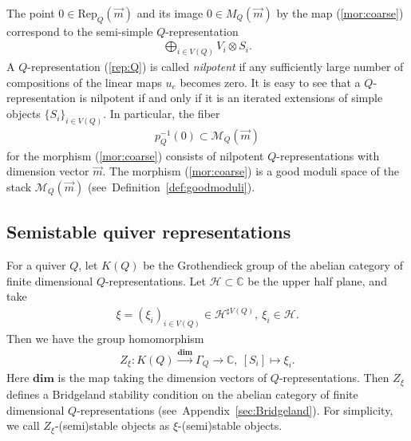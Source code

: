 \documentclass[11pt]{amsart}
\theoremstyle{plain}
\theoremstyle{definition}
\theoremstyle{remark}
\newcommand{\hH}{\mathcal{H}}
\newcommand{\mM}{\mathcal{M}}
\begin{document}
The point $0 \in \mathrm{Rep}_Q(\vec{m})$ and its 
image $0 \in M_Q(\vec{m})$ by the map (\ref{mor:coarse})
correspond to the semi-simple $Q$-representation 
\begin{align*}
\bigoplus_{i\in V(Q)}V_i \otimes S_i.
\end{align*}
A $Q$-representation (\ref{rep:Q})
is called \textit{nilpotent} if any sufficiently large number of 
compositions of the linear maps $u_e$ becomes zero. 
It is easy to see that 
a $Q$-representation is nilpotent if and only if it is 
an iterated extensions of simple objects 
$\{S_i\}_{i \in V(Q)}$. 
In particular, 
the fiber 
\begin{align*}
p_Q^{-1}(0) \subset \mM_Q(\vec{m})
\end{align*}
 for the morphism (\ref{mor:coarse})
consists of nilpotent $Q$-representations
with dimension vector $\vec{m}$. 
The morphism (\ref{mor:coarse})
is a good moduli space
of the stack $\mM_Q(\vec{m})$
(see~Definition~\ref{def:goodmoduli}). 


\subsection{Semistable quiver representations}
For a quiver $Q$, let $K(Q)$ be the Grothendieck group of the 
abelian category of 
finite dimensional 
$Q$-representations. 
Let 
$\hH \subset \mathbb{C}$ be the upper half plane, and take 
\begin{align}\label{xi}
\xi=(\xi_i)_{i \in V(Q)} \in \hH^{\sharp V(Q)}, \ \xi_i \in \hH.  
\end{align}
Then we have the group homomorphism 
\begin{align}\label{K:dim}
Z_{\xi} \colon K(Q) \stackrel{\mathbf{dim}}{\to} \Gamma_Q \to
 \mathbb{C}, \ 
[S_i] \mapsto \xi_i. 
\end{align}
Here $\mathbf{dim}$ is the map taking the dimension vectors
of $Q$-representations. 
Then $Z_{\xi}$ defines a Bridgeland stability 
condition on the abelian 
category of finite dimensional $Q$-representations
(see~Appendix~\ref{sec:Bridgeland}). 
For simplicity, we call
$Z_{\xi}$-(semi)stable objects as 
$\xi$-(semi)stable objects. 
\end{document}

